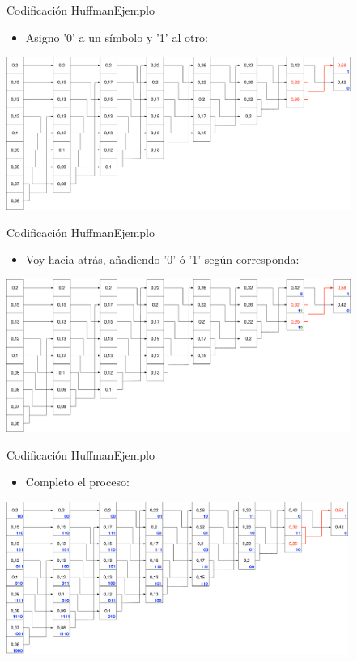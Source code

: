 \documentclass[10pt,compress]{beamer} %
\begin{document}
\begin{frame}{Codificación Huffman}{Ejemplo}
  \begin{itemize}
    \item Asigno '0' a un símbolo y '1' al otro:
  \end{itemize}
  \centering \includegraphics[height=5cm]{./Figuras/Huffman8.pdf}
\end{frame}

\begin{frame}{Codificación Huffman}{Ejemplo}
  \begin{itemize}
    \item Voy hacia atrás, añadiendo '0' ó '1' según corresponda:
  \end{itemize}
  \centering \includegraphics[height=5cm]{./Figuras/Huffman9.pdf}
\end{frame}

\begin{frame}{Codificación Huffman}{Ejemplo}
  \begin{itemize}
    \item Completo el proceso:
  \end{itemize}
  \centering \includegraphics[height=5cm]{./Figuras/Huffman10.pdf}
\end{frame}
\end{document}

